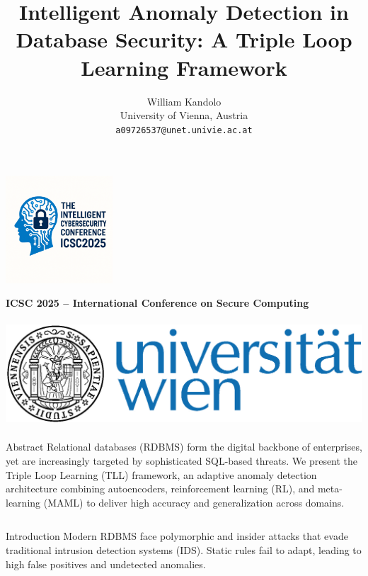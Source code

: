 \documentclass[final]{beamer}
\title{Intelligent Anomaly Detection in Database Security: A Triple Loop Learning Framework}
\author{William Kandolo \\ University of Vienna, Austria \\ \texttt{a09726537@unet.univie.ac.at}}
\begin{document}
\begin{frame}[t]

\begin{center}
  \includegraphics[height=4cm]{images/icsc2025_logo.png}\hfill
  \begin{minipage}{0.7\textwidth}
    {\centering
    \vspace{-1em}
    \inserttitle\par
    \vspace{0.5em}
    \insertauthor\par
    \vspace{0.5em}
    \textbf{ICSC 2025 – International Conference on Secure Computing}}
  \end{minipage}\hfill
  \includegraphics[height=4cm]{images/univie_logo.png}
\end{center}

\begin{block}{Abstract}
Relational databases (RDBMS) form the digital backbone of enterprises, yet are increasingly targeted by sophisticated SQL-based threats. We present the Triple Loop Learning (TLL) framework, an adaptive anomaly detection architecture combining autoencoders, reinforcement learning (RL), and meta-learning (MAML) to deliver high accuracy and generalization across domains.
\end{block}

\begin{columns}[t]

\begin{column}{0.32\textwidth}
\begin{block}{Introduction}
Modern RDBMS face polymorphic and insider attacks that evade traditional intrusion detection systems (IDS). Static rules fail to adapt, leading to high false positives and undetected anomalies.
\end{block}


\end{column}
\end{columns}
\end{frame}
\end{document}
